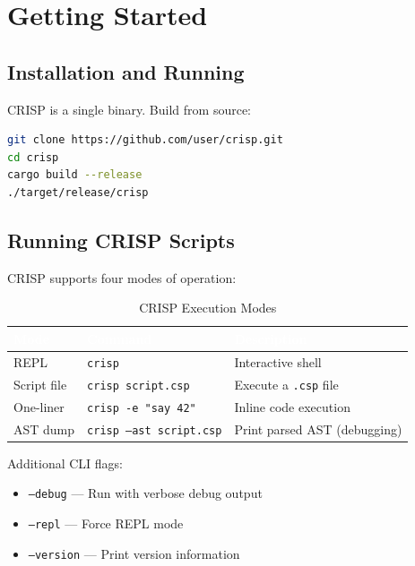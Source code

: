 \section{Getting Started}

\subsection{Installation and Running}

CRISP is a single binary. Build from source:

\begin{lstlisting}[language=bash]
git clone https://github.com/user/crisp.git
cd crisp
cargo build --release
./target/release/crisp
\end{lstlisting}

\subsection{Running CRISP Scripts}

CRISP supports four modes of operation:

\begin{table}[H]
\centering
{}
\caption{\textcolor{darkpurple}{CRISP Execution Modes}}
\vspace{0.3em}
\begin{tabular}{@{}lll@{}}
\toprule
\rowcolor{softvioletdark}
\textbf{\textcolor{white}{Mode}} & \textbf{\textcolor{white}{Command}} & \textbf{\textcolor{white}{Description}} \\
\midrule
REPL & \texttt{crisp} & Interactive shell \\
Script file & \texttt{crisp script.csp} & Execute a \texttt{.csp} file \\
One-liner & \texttt{crisp -e "say 42"} & Inline code execution \\
AST dump & \texttt{crisp --ast script.csp} & Print parsed AST (debugging) \\
\bottomrule
\end{tabular}
\end{table}

Additional CLI flags:
\begin{itemize}
    \item \texttt{--debug} — Run with verbose debug output
    \item \texttt{--repl} — Force REPL mode
    \item \texttt{--version} — Print version information
\end{itemize}

